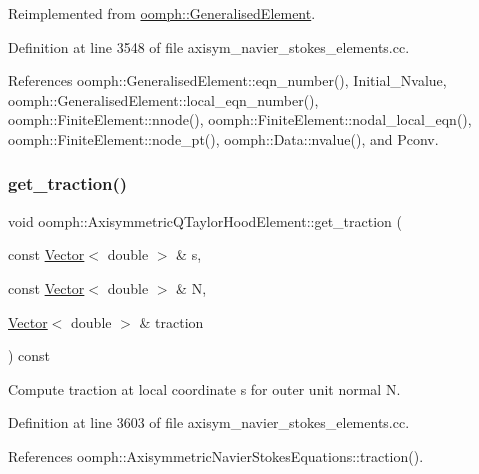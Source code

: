 Reimplemented from \hyperlink{classoomph_1_1GeneralisedElement_a069f59bfc3e607a5bebba52c6314d777}{oomph\+::\+Generalised\+Element}.



Definition at line 3548 of file axisym\+\_\+navier\+\_\+stokes\+\_\+elements.\+cc.



References oomph\+::\+Generalised\+Element\+::eqn\+\_\+number(), Initial\+\_\+\+Nvalue, oomph\+::\+Generalised\+Element\+::local\+\_\+eqn\+\_\+number(), oomph\+::\+Finite\+Element\+::nnode(), oomph\+::\+Finite\+Element\+::nodal\+\_\+local\+\_\+eqn(), oomph\+::\+Finite\+Element\+::node\+\_\+pt(), oomph\+::\+Data\+::nvalue(), and Pconv.

\mbox{\label{classoomph_1_1AxisymmetricQTaylorHoodElement_abfaf2fb0ff51a888f77c724af8c20809}} 
\subsubsection{\texorpdfstring{get\+\_\+traction()}{get\_traction()}}
{\footnotesize\ttfamily void oomph\+::\+Axisymmetric\+Q\+Taylor\+Hood\+Element\+::get\+\_\+traction (\begin{DoxyParamCaption}\item[{const \hyperlink{classoomph_1_1Vector}{Vector}$<$ double $>$ \&}]{s,  }\item[{const \hyperlink{classoomph_1_1Vector}{Vector}$<$ double $>$ \&}]{N,  }\item[{\hyperlink{classoomph_1_1Vector}{Vector}$<$ double $>$ \&}]{traction }\end{DoxyParamCaption}) const}



Compute traction at local coordinate s for outer unit normal N. 



Definition at line 3603 of file axisym\+\_\+navier\+\_\+stokes\+\_\+elements.\+cc.



References oomph\+::\+Axisymmetric\+Navier\+Stokes\+Equations\+::traction().

\mbox{\label{classoomph_1_1AxisymmetricQTaylorHoodElement_a9cd3bbcb75c7a4501c3de68e524a5503}} 
